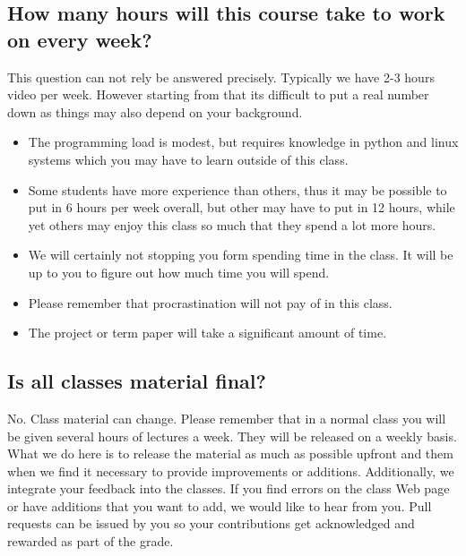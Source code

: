 \subsection{How many hours will this course take to work on every week?}
\label{\detokenize{faq:how-many-hours-will-this-course-take-to-work-on-every-week}}
This question can not rely be answered precisely. Typically we have
2-3 hours video per week. However starting from that its difficult to
put a real number down as things may also depend on your background.
\begin{itemize}
\item {} 
The programming load is modest, but requires knowledge in python and
linux systems which you may have to learn outside of this class.

\item {} 
Some students have more experience than others, thus it may be
possible to put in 6 hours per week overall, but other may have to
put in 12 hours, while yet others may enjoy this class so much that
they spend a lot more hours.

\item {} 
We will certainly not stopping you form spending time in the class.
It will be up to you to figure out how much time you will spend.

\item {} 
Please remember that procrastination will not pay of in this class.

\item {} 
The project or term paper will take a significant amount of time.

\end{itemize}


\subsection{Is all classes material final?}
\label{\detokenize{faq:is-all-classes-material-final}}
No. Class material can change. Please remember that in a normal class
you will be given several hours of lectures a week. They will be
released on a weekly basis. What we do here is to release the material
as much as possible upfront and  them when we find it
necessary to provide improvements or additions. Additionally, we
integrate your feedback into the classes. If you find errors on the
class Web page or have additions that you want to add, we would like
to hear from you. Pull requests can be issued by you so your
contributions get acknowledged and rewarded as part of the grade.


